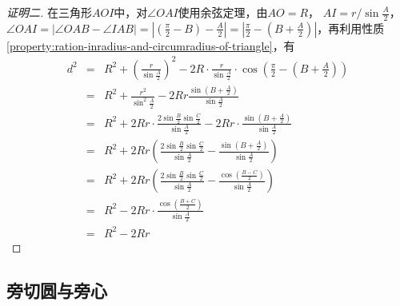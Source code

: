 \begin{proof}[证明二]
  在三角形$AOI$中，对$\angle OAI$使用余弦定理，由$AO=R$， $AI=r/\sin{\frac{A}{2}}$，$\angle OAI = \left| \angle OAB - \angle IAB \right| = \left| \left( \frac{\pi}{2}-B \right) - \frac{A}{2} \right| = \left| \frac{\pi}{2} - \left( B+\frac{A}{2} \right) \right|$，再利用性质\ref{property:ration-inradius-and-circumradius-of-triangle}，有
  \begin{eqnarray*}
    d^2 & = & R^2+\left( \frac{r}{\sin{\frac{A}{2}}} \right)^2 - 2R \cdot \frac{r}{\sin{\frac{A}{2}}} \cdot \cos{\left( \frac{\pi}{2}-\left( B+\frac{A}{2} \right) \right)} \\
        & = & R^2 + \frac{r^2}{\sin^2 \frac{A}{2}} -2Rr \frac{\sin{\left( B+\frac{A}{2} \right)}}{\sin{\frac{A}{2}}} \\
    & = & R^2 + 2Rr \cdot \frac{2\sin{\frac{B}{2}}\sin{\frac{C}{2}}}{\sin{\frac{A}{2}}}-2Rr \cdot \frac{\sin{\left( B+\frac{A}{2} \right)}}{\sin{\frac{A}{2}}} \\
        & = & R^2 + 2Rr \left( \frac{2\sin{\frac{B}{2}}\sin{\frac{C}{2}}}{\sin{\frac{A}{2}}} - \frac{\sin{\left( B+\frac{A}{2} \right)}}{\sin{\frac{A}{2}}} \right) \\
        & = & R^2 + 2Rr \left( \frac{2\sin{\frac{B}{2}}\sin{\frac{C}{2}}}{\sin{\frac{A}{2}}} - \frac{\cos{\left( \frac{B-C}{2} \right)}}{\sin{\frac{A}{2}}} \right) \\
        & = & R^2 - 2Rr \cdot \frac{\cos{\left( \frac{B+C}{2} \right)}}{\sin{\frac{A}{2}}} \\
    & = & R^2 - 2Rr
  \end{eqnarray*}
\end{proof}

\subsection{旁切圆与旁心}
\label{sec:escenter}



